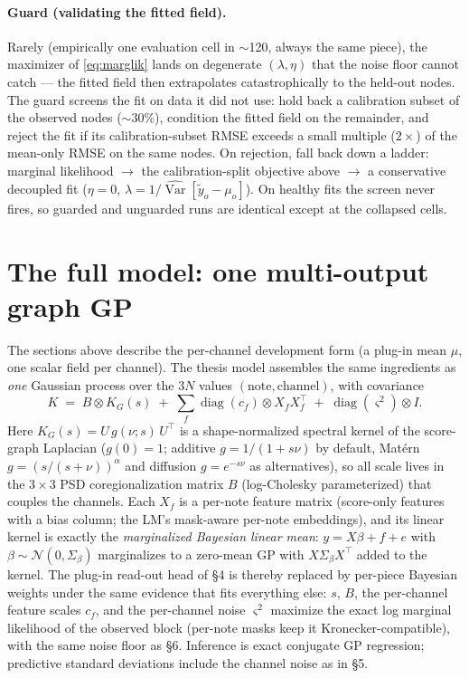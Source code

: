 \documentclass[11pt]{article}
\newcommand{\N}{\mathcal{N}}
\begin{document}
\paragraph{Guard (validating the fitted field).}
Rarely (empirically one evaluation cell in $\sim$120, always the same piece), the
maximizer of \eqref{eq:marglik} lands on degenerate $(\lambda, \eta)$ that the noise
floor cannot catch --- the fitted field then extrapolates catastrophically to the
held-out nodes. The guard screens the fit on data it did not use: hold back a
calibration subset of the observed nodes ($\sim$30\%), condition the fitted field on the
remainder, and reject the fit if its calibration-subset RMSE exceeds a small multiple
($2\times$) of the mean-only RMSE on the same nodes. On rejection, fall back down a
ladder: marginal likelihood $\to$ the calibration-split objective above $\to$ a
conservative decoupled fit ($\eta = 0$, $\lambda = 1/\widehat{\operatorname{Var}}[\tilde
y_o - \mu_o]$). On healthy fits the screen never fires, so guarded and unguarded runs are
identical except at the collapsed cells.

\section{The full model: one multi-output graph GP}

The sections above describe the per-channel development form (a plug-in mean
$\mu$, one scalar field per channel). The thesis model assembles the same
ingredients as \emph{one} Gaussian process over the $3N$ values
$(\text{note}, \text{channel})$, with covariance
\begin{equation}
K \;=\; B \otimes K_G(s)\; +\; \sum_f \operatorname{diag}(c_f) \otimes X_f X_f^\top
\;+\; \operatorname{diag}(\varsigma^2) \otimes I .
\label{eq:gpfirst-form}
\end{equation}
Here $K_G(s) = U\,g(\nu; s)\,U^\top$ is a shape-normalized spectral kernel of the
score-graph Laplacian ($g(0) = 1$; additive $g = 1/(1+s\nu)$ by default, Mat\'ern
$g = (s/(s+\nu))^{\alpha}$ and diffusion $g = e^{-s\nu}$ as alternatives), so all
scale lives in the $3\times 3$ PSD coregionalization matrix $B$ (log-Cholesky
parameterized) that couples the channels. Each $X_f$ is a per-note feature matrix
(score-only features with a bias column; the LM's mask-aware per-note embeddings),
and its linear kernel is exactly the \emph{marginalized Bayesian linear mean}:
$y = X\beta + f + e$ with $\beta \sim \N(0, \Sigma_\beta)$ marginalizes to a
zero-mean GP with $X\Sigma_\beta X^\top$ added to the kernel. The plug-in read-out
head of \S4 is thereby replaced by per-piece Bayesian weights under the same
evidence that fits everything else: $s$, $B$, the per-channel feature scales
$c_f$, and the per-channel noise $\varsigma^2$ maximize the exact log marginal
likelihood of the observed block (per-note masks keep it Kronecker-compatible),
with the same noise floor as \S6. Inference is exact conjugate GP regression;
predictive standard deviations include the channel noise as in \S5.
\end{document}
